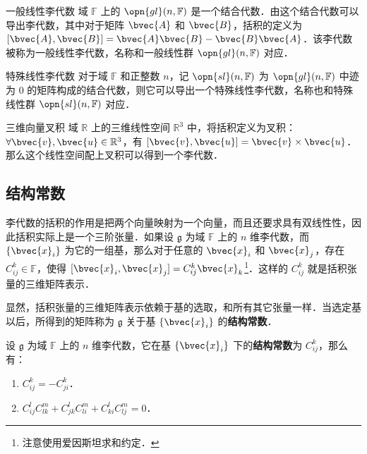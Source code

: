 \begin{example}{一般线性李代数}
域 $\mathbb{F}$ 上的 $\opn{gl}(n, \mathbb{F})$ 是一个结合代数．由这个结合代数可以导出李代数，其中对于矩阵 $\bvec{A}$ 和 $\bvec{B}$，括积的定义为 $[\bvec{A}, \bvec{B}]=\bvec{A}\bvec{B}-\bvec{B}\bvec{A}$．该李代数被称为一般线性李代数，名称和一般线性群 $\opn{gl}(n, \mathbb{F})$ 对应．
\end{example}

\begin{example}{特殊线性李代数}
对于域 $\mathbb{F}$ 和正整数 $n$，记 $\opn{sl}(n, \mathbb{F})$ 为 $\opn{gl}(n, \mathbb{F})$ 中迹为 $0$ 的矩阵构成的结合代数，则它可以导出一个特殊线性李代数，名称也和特殊线性群 $\opn{sl}(n, \mathbb{F})$ 对应．
\end{example}

\begin{example}{三维向量叉积}\label{LieAlg_ex1}
域 $\mathbb{R}$ 上的三维线性空间 $\mathbb{R}^3$ 中，将括积定义为叉积：$\forall \bvec{v}, \bvec{u}\in \mathbb{R}^3$，有 $[\bvec{v}, \bvec{u}]=\bvec{v}\times\bvec{u}$．那么这个线性空间配上叉积可以得到一个李代数．
\end{example}

\subsection{结构常数}

李代数的括积的作用是把两个向量映射为一个向量，而且还要求具有双线性性，因此括积实际上是一个三阶张量．如果设 $\mathfrak{g}$ 为域 $\mathbb{F}$ 上的 $n$ 维李代数，而 $\{\bvec{x}_i\}$ 为它的一组基，那么对于任意的 $\bvec{x}_i$ 和 $\bvec{x}_j$，存在 $C^k_{ij}\in\mathbb{F}$，使得 $[\bvec{x}_i, \bvec{x}_j]=C^k_{ij}\bvec{x}_k$\footnote{注意使用爱因斯坦求和约定．}．这样的 $C^k_{ij}$ 就是括积张量的三维矩阵表示．

显然，括积张量的三维矩阵表示依赖于基的选取，和所有其它张量一样．当选定基以后，所得到的矩阵称为 $\mathfrak{g}$ 关于基 $\{\bvec{x}_i\}$ 的\textbf{结构常数}．

\begin{theorem}{}\label{LieAlg_the1}
设 $\mathfrak{g}$ 为域 $\mathbb{F}$ 上的 $n$ 维李代数，它在基 $\{\bvec{x}_i\}$ 下的\textbf{结构常数}为 $C^k_{ij}$，那么有：
\begin{enumerate}
\item $C^k_{ij}=-C^k_{ji}$．
\item $C^l_{ij}C^m_{lk}+C^l_{jk}C^m_{li}+C^l_{ki}C^m_{lj}=0$．
\end{enumerate}
\end{theorem}

